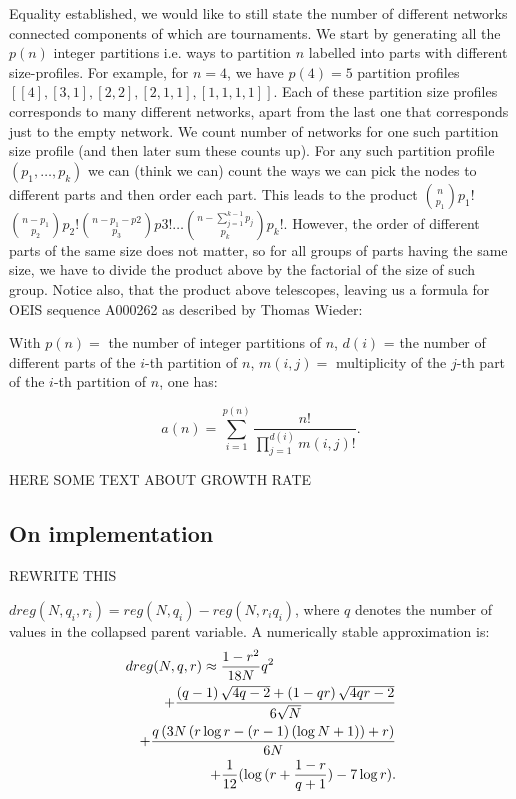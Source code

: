 Equality established, we would like to still state the number of
different networks connected components of which are tournaments.  We
start by generating all the $p(n)$ integer partitions i.e. ways to
partition $n$ labelled into parts with different size-profiles.  For
example, for $n=4$, we have $p(4)=5$ partition profiles $[[4], [3, 1],
  [2, 2], [2, 1, 1], [1, 1, 1, 1]]$.  Each of these partition size
profiles corresponds to many different networks, apart from the last
one that corresponds just to the empty network.  We count number of
networks for one such partition size profile (and then later sum these
counts up).  For any such partition profile $(p_1,\ldots,p_k)$ we can
(think we can) count the ways we can pick the nodes to different parts
and then order each part. This leads to the product $n\choose
p_1$$p_1$!${n-p_1}\choose p_2$$p_2!$${n-p_1-p2}\choose
p_3$$p3!$$\ldots$${n-\sum_{j=1}^{k-1}p_j}\choose p_k$$p_k!$. However,
the order of different parts of the same size does not matter, so for
all groups of parts having the same size, we have to divide the
product above by the factorial of the size of such group. Notice also,
that the product above telescopes, leaving us a formula for OEIS
sequence A000262 as described by Thomas Wieder:

With $p(n) =$ the number of integer partitions of $n$, 
     $d(i)$ = the number of different parts of the $i$-th partition of $n$, $m(i,j) =$ multiplicity of the $j$-th part of the $i$-th partition of $n$,  one has: 

$$
a(n) = \sum_{i=1}^{p(n)} \frac{n!}{\prod_{j=1}^{d(i)} m(i,j)!}.
$$

HERE SOME TEXT ABOUT GROWTH RATE

\subsection{On implementation}

REWRITE THIS

$dreg(N,q_i,r_i)=reg(N,q_i) -reg(N,r_i q_i)$, where $q$ denotes the number of values in the
collapsed parent variable.  A numerically stable approximation is:
\begin{eqnarray}
\lefteqn{dreg(N,q,r)\approx\frac{1-r^2}{18 N} q^{2}} \\
&&+ \frac{\left(q - 1\right) \sqrt{4 q - 2} + \left(1 - q r\right) \sqrt{4 q r - 2}}{6 \sqrt{N}} \nonumber\\
&&+\frac{q\left(3 N \left(r \log{r}  - \left(r - 1\right) \left(\log{N} + 1\right)\right) + r\right)}{6 N} \nonumber\\
&&+ \frac{1}{12}(\log{(r+\frac{1-r}{q+1})}- 7\log{r}).\nonumber
\end{eqnarray}
